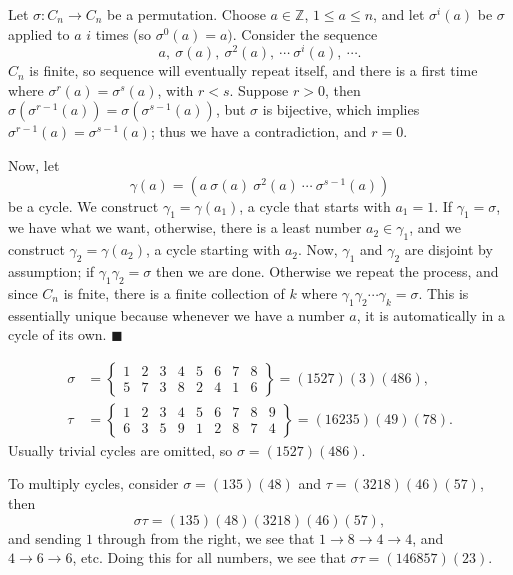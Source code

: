 \documentclass[letter-paper]{tufte-book}
\newenvironment{proof}[1][Proof]{\begin{trivlist}
\item[\hskip \labelsep {\bfseries #1}]}{\end{trivlist}}
\newenvironment{example}[1][Example]{\begin{trivlist}
\item[\hskip \labelsep {\bfseries #1}]}{\end{trivlist}}
\newcommand{\qed}{\hfill$\blacksquare$}
\begin{document}
\begin{proof}
  Let $\sigma:C_n\rightarrow C_n$ be a permutation. Choose $a\in\mathbb{Z}$,
  $1\leq a\leq n$, and let $\sigma^i(a)$ be $\sigma$ applied to $a$ $i$ times
  (so $\sigma^0(a)=a)$. Consider the sequence
  \begin{equation*}
    a,\ \sigma(a),\ \sigma^2(a),\ \cdots\ \sigma^i(a),\ \cdots.
  \end{equation*}
  $C_n$ is finite, so sequence will eventually repeat itself, and there is a
  first time where $\sigma^r(a)=\sigma^s(a)$, with $r<s$. Suppose $r>0$, then
  $\sigma(\sigma^{r-1}(a))=\sigma(\sigma^{s-1}(a))$, but $\sigma$ is bijective,
  which implies $\sigma^{r-1}(a)=\sigma^{s-1}(a)$; thus we have a contradiction,
  and $r=0$. 
  
  Now, let
  \begin{equation*}
    \gamma(a)=\left(a\ \sigma(a)\ \sigma^2(a)\ \cdots\ \sigma^{s-1}(a)\right)
  \end{equation*}
  be a cycle. We construct $\gamma_1=\gamma(a_1)$, a cycle that starts with
  $a_1=1$. If $\gamma_1=\sigma$, we have what we want, otherwise, there is
  a least number $a_2\in\gamma_1$, and we construct $\gamma_2=\gamma(a_2)$,
  a cycle starting with $a_2$. Now, $\gamma_1$ and $\gamma_2$ are disjoint
  by assumption; if $\gamma_1\gamma_2=\sigma$ then we are done. Otherwise we
  repeat the process, and since $C_n$ is fnite, there is a finite collection
  of $k$ where $\gamma_1\gamma_2\cdots\gamma_k=\sigma$. This is essentially
  unique because whenever we have a number $a$, it is automatically in a cycle
  of its own. \qed
\end{proof}
\begin{example}
  \begin{align*}
    \sigma&=\left\{\begin{matrix}
    1 & 2 & 3 & 4 & 5 & 6 & 7 & 8\\
    5 & 7 & 3 & 8 & 2 & 4 & 1 & 6\end{matrix}\right\}=(1527)(3)(486),\\
    \tau&=\left\{\begin{matrix}
    1 & 2 & 3 & 4 & 5 & 6 & 7 & 8 & 9\\
    6 & 3 & 5 & 9 & 1 & 2 & 8 & 7 & 4\end{matrix}\right\}=(16235)(49)(78).
  \end{align*}
  Usually trivial cycles are omitted, so $\sigma=(1527)(486)$.
\end{example}
\begin{example}
  To multiply cycles, consider $\sigma=(135)(48)$ and $\tau=(3218)(46)(57)$, 
  then
  \begin{equation*}
    \sigma\tau=(135)(48)(3218)(46)(57),
  \end{equation*}
  and sending $1$ through from the right, we see that $1\rightarrow8\rightarrow4
  \rightarrow4$, and $4\rightarrow6\rightarrow6$, etc. Doing this for all 
  numbers, we see that $\sigma\tau=(146857)(23)$.
\end{example}
\end{document}
